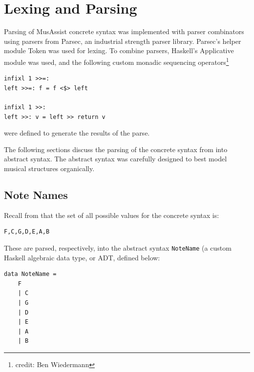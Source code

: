 \documentclass{report}
\newcommand\param[1]{\textttu{<#1>}}
\begin{document}
\chapter{Lexing and Parsing}

Parsing of MusAssist concrete syntax was implemented with parser combinators using parsers from Parsec, an industrial strength parser library. Parsec's helper module Token was used for lexing. To combine parsers, Haskell's Applicative module was used, and the following custom monadic sequencing operators\footnote{credit: Ben Wiedermann}
\begin{verbatim}
infixl 1 >>=:
left >>=: f = f <$> left

infixl 1 >>:
left >>: v = left >> return v
\end{verbatim}

were defined to generate the results of the parse.

The following sections discuss the parsing of the concrete syntax from  into abstract syntax. The abstract syntax was carefully designed to best model musical structures organically.
\section{Note Names}
Recall from  that the set of all possible values for the concrete syntax \param{NOTENAME} is:
\begin{verbatim}
F,C,G,D,E,A,B
\end{verbatim}

These are parsed, respectively, into the abstract syntax \verb.NoteName. (a custom Haskell algebraic data type, or ADT, defined below:

\begin{verbatim}
data NoteName = 
    F
    | C
    | G 
    | D 
    | E 
    | A 
    | B
\end{verbatim}
\end{document}
